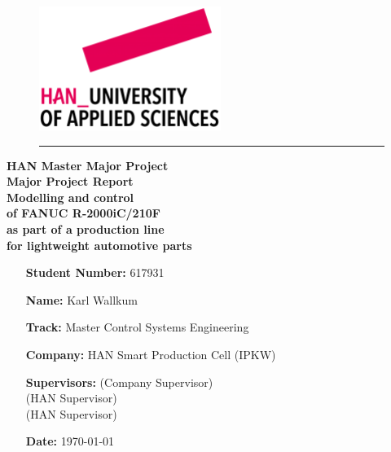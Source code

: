 \begin{titlepage}
	\begin{flushright}
	\begin{minipage}{\linewidth}
		\begin{figure}[H]
			\begin{flushright}
			\includegraphics[width=0.3\linewidth]{Images/HAN_new}
		\end{flushright}
		\hrule
		\end{figure}
	
		\begin{flushright}
			\large\textbf{ HAN Master Major Project}\\
			\vspace{20pt}
			\Huge\textbf{Major Project Report
			\\
			\vspace{10pt}
			Modelling and control \\
			of FANUC R-2000iC/210F \\%
			as part of a production line \\
			for lightweight automotive parts
		}
		\end{flushright}
	
		\vspace{40pt}
		
		\begin{itemize}[leftmargin=4.5cm]
			\LARGE	
			\item[\textbf{Student Number:}] 617931		
			\item[\textbf{Name:}] Karl Wallkum 			
			\item[\textbf{Track:}] Master Control Systems Engineering
			\item[\textbf{Company:}]  HAN Smart Production Cell (IPKW)
			\item[\textbf{Supervisors:}]  \CompanySupervisor (Company Supervisor)\\ \HANSupervisor (HAN Supervisor)\\ \AdditionalSupervisor(HAN Supervisor)			
			\item[\textbf{Date:}] \today	
		\end{itemize}
	\end{minipage}
	\end{flushright}


\end{titlepage}
